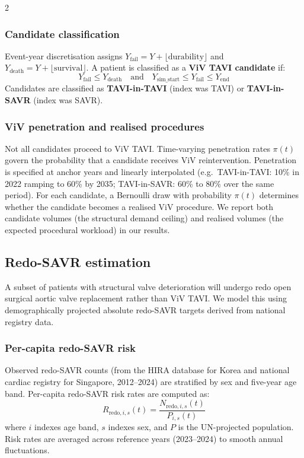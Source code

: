 \documentclass[10pt, a4paper]{article}
\begin{document}
\begin{multicols}{2}
\subsubsection{Candidate classification}

Event-year discretisation assigns $Y_{\text{fail}} = Y + \lfloor \text{durability} \rfloor$ and $Y_{\text{death}} = Y + \lfloor \text{survival} \rfloor$. A patient is classified as a \textbf{ViV TAVI candidate} if:
%
\begin{equation}
Y_{\text{fail}} \leq Y_{\text{death}} \quad \text{and} \quad Y_{\text{sim\_start}} \leq Y_{\text{fail}} \leq Y_{\text{end}}
\end{equation}
%
Candidates are classified as \textbf{TAVI-in-TAVI} (index was TAVI) or \textbf{TAVI-in-SAVR} (index was SAVR).

\subsubsection{ViV penetration and realised procedures}

Not all candidates proceed to ViV TAVI. Time-varying penetration rates $\pi(t)$ govern the probability that a candidate receives ViV reintervention. Penetration is specified at anchor years and linearly interpolated (e.g.\ TAVI-in-TAVI: 10\% in 2022 ramping to 60\% by 2035; TAVI-in-SAVR: 60\% to 80\% over the same period). For each candidate, a Bernoulli draw with probability $\pi(t)$ determines whether the candidate becomes a realised ViV procedure. We report both candidate volumes (the structural demand ceiling) and realised volumes (the expected procedural workload) in our results.

\subsection{Redo-SAVR estimation}

A subset of patients with structural valve deterioration will undergo redo open surgical aortic valve replacement rather than ViV TAVI. We model this using demographically projected absolute redo-SAVR targets derived from national registry data.

\subsubsection{Per-capita redo-SAVR risk}

Observed redo-SAVR counts (from the HIRA database for Korea and national cardiac registry for Singapore, 2012--2024) are stratified by sex and five-year age band. Per-capita redo-SAVR risk rates are computed as:
%
\begin{equation}
R_{\text{redo},i,s}(t) = \frac{N_{\text{redo},i,s}(t)}{P_{i,s}(t)}
\end{equation}
%
where $i$ indexes age band, $s$ indexes sex, and $P$ is the UN-projected population. Risk rates are averaged across reference years (2023--2024) to smooth annual fluctuations.


\end{multicols}
\end{document}

